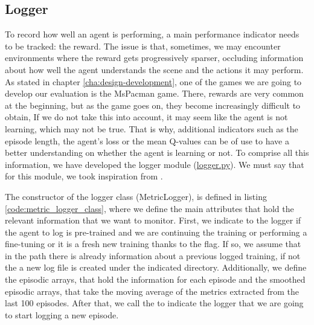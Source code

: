 \subsection{Logger}
To record how well an agent is performing, a main performance indicator needs to be tracked: the reward. The issue is that, sometimes, we may encounter environments where the reward gets progressively sparser, occluding information about how well the agent understands the scene and the actions it may perform. As stated in chapter \ref{cha:design-development}, one of the games we are going to develop our evaluation is the MsPacman game. There, rewards are very common at the beginning, but as the game goes on, they become increasingly difficult to obtain, If we do not take this into account, it may seem like the agent is not learning, which may not be true. That is why, additional indicators such as the episode length, the agent's loss or the mean Q-values can be of use to have a better understanding on whether the agent is learning or not. To comprise all this information, we have developed the logger module (\href{https://github.com/Javimh18/DL_TFM/blob/main/src/utils/logger.py}{logger.py}). We must say that for this module, we took inspiration from \cite{feng2022mario}.

The constructor of the logger class (MetricLogger), is defined in listing \ref{code:metric_logger_class}, where we define the main attributes that hold the relevant information that we want to monitor. First, we indicate to the logger if the agent to log is pre-trained and we are continuing the training or performing a fine-tuning or it is a fresh new training thanks to the  flag. If so, we assume that in the  path there is already information about a previous logged training, if not the a new log file is created under the indicated directory. Additionally, we define the episodic arrays, that hold the information for each episode and the smoothed episodic arrays, that take the moving average of the metrics extracted from the last 100 episodes. After that, we call the  to indicate the logger that we are going to start logging a new episode.

